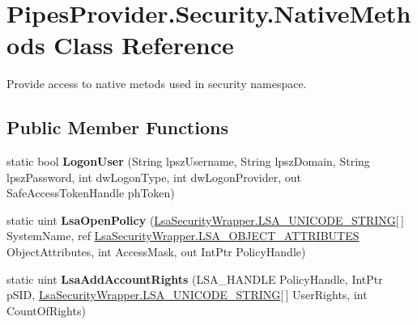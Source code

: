 \hypertarget{class_pipes_provider_1_1_security_1_1_native_methods}{}\section{Pipes\+Provider.\+Security.\+Native\+Methods Class Reference}
\label{class_pipes_provider_1_1_security_1_1_native_methods}


Provide access to native metods used in security namespace.  


\subsection*{Public Member Functions}
\begin{DoxyCompactItemize}
\item 
\mbox{\label{class_pipes_provider_1_1_security_1_1_native_methods_aa8cbc36f4c83e56734a90e4f82599a14}} 
static bool {\bfseries Logon\+User} (String lpsz\+Username, String lpsz\+Domain, String lpsz\+Password, int dw\+Logon\+Type, int dw\+Logon\+Provider, out Safe\+Access\+Token\+Handle ph\+Token)
\item 
\mbox{\label{class_pipes_provider_1_1_security_1_1_native_methods_aaa43d5b08023ba65a847545f43bca37a}} 
static uint {\bfseries Lsa\+Open\+Policy} (\mbox{\hyperlink{struct_pipes_provider_1_1_security_1_1_l_s_a_1_1_lsa_security_wrapper_1_1_l_s_a___u_n_i_c_o_d_e___s_t_r_i_n_g}{Lsa\+Security\+Wrapper.\+L\+S\+A\+\_\+\+U\+N\+I\+C\+O\+D\+E\+\_\+\+S\+T\+R\+I\+NG}}\mbox{[}$\,$\mbox{]} System\+Name, ref \mbox{\hyperlink{struct_pipes_provider_1_1_security_1_1_l_s_a_1_1_lsa_security_wrapper_1_1_l_s_a___o_b_j_e_c_t___a_t_t_r_i_b_u_t_e_s}{Lsa\+Security\+Wrapper.\+L\+S\+A\+\_\+\+O\+B\+J\+E\+C\+T\+\_\+\+A\+T\+T\+R\+I\+B\+U\+T\+ES}} Object\+Attributes, int Access\+Mask, out Int\+Ptr Policy\+Handle)
\item 
\mbox{\label{class_pipes_provider_1_1_security_1_1_native_methods_a41f3c8a115df5b26700d24b6ead2d687}} 
static uint {\bfseries Lsa\+Add\+Account\+Rights} (L\+S\+A\+\_\+\+H\+A\+N\+D\+LE Policy\+Handle, Int\+Ptr p\+S\+ID, \mbox{\hyperlink{struct_pipes_provider_1_1_security_1_1_l_s_a_1_1_lsa_security_wrapper_1_1_l_s_a___u_n_i_c_o_d_e___s_t_r_i_n_g}{Lsa\+Security\+Wrapper.\+L\+S\+A\+\_\+\+U\+N\+I\+C\+O\+D\+E\+\_\+\+S\+T\+R\+I\+NG}}\mbox{[}$\,$\mbox{]} User\+Rights, int Count\+Of\+Rights)

\end{DoxyCompactItemize}
